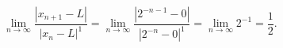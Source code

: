 \documentclass[
	spanish,
	8pt,
	utf8,
	xcolor=table,
	handout,
	aspectratio=169,
	professionalfonts,
	mathserif,
	leqno,
]{beamer}
\begin{document}
\begin{frame}
\begin{solution}
\begin{description}
				\begin{math}
					\lim\limits_{n\to\infty}
					\dfrac{
					\left|x_{n+1}-L\right|
					}{
					{\left|x_{n}-L\right|}^{1}
					}=
					\lim\limits_{n\to\infty}
					\dfrac{
					\left|{2^{-n-1}}-0\right|
					}{
					{\left|{2^{-n}}-0\right|}^{1}
					}
					=\lim\limits_{n\to\infty}
					{
						{2^{-1}}
					}
					=
					\dfrac{1}{2}.
				\end{math}



		\end{description}
	\end{solution}
\end{frame}
\end{document}
